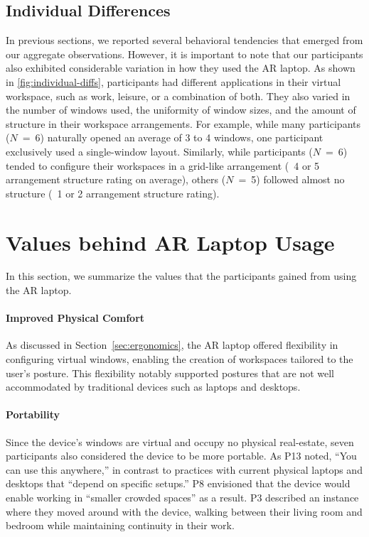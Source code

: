 \subsection{Individual Differences}
In previous sections, we reported several behavioral tendencies that emerged from our aggregate observations. However, it is important to note that our participants also exhibited considerable variation in how they used the AR laptop.
As shown in \autoref{fig:individual-diffs}, participants had different applications in their virtual workspace, such as work, leisure, or a combination of both. They also varied in the number of windows used, the uniformity of window sizes, and the amount of structure in their workspace arrangements.
For example, while many participants ($N$~=~6) naturally opened an average of 3 to 4 windows, one participant exclusively used a single-window layout. 
Similarly, while participants ($N$~=~6) tended to configure their workspaces in a grid-like arrangement (\ie~4 or 5 arrangement structure rating on average),  others ($N$~=~5) followed almost no structure (\ie~1 or 2 arrangement structure rating).

\section{Values behind AR Laptop Usage}
In this section, we summarize the values that the participants gained from using the AR laptop. 

\paragraph{Improved Physical Comfort}
As discussed in Section~\ref{sec:ergonomics}, the AR laptop offered flexibility in configuring virtual windows, enabling the creation of workspaces tailored to the user's posture. This flexibility notably supported postures that are not well accommodated by traditional devices such as laptops and desktops.

\paragraph{Portability}
Since the device's windows are virtual and occupy no physical real-estate, 
seven
participants also considered the device to be more portable.
As P13 noted, ``You can use this anywhere,'' in contrast to practices with current physical laptops and desktops that ``depend on specific setups.'' 
P8 envisioned that the device would enable working in ``smaller crowded spaces'' as a result.
P3 described an instance where they moved around with the device, walking between their living room and bedroom while maintaining continuity in their work. 

